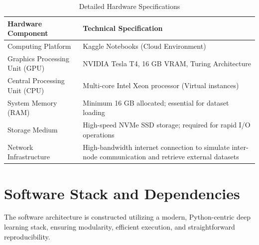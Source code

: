 \documentclass[12pt,a4paper]{report}
\begin{document}
\begin{table}[H]
\centering
\caption{Detailed Hardware Specifications}
\label{tab:hardware}
\begin{tabular}{p{4.5cm}p{7.5cm}}
\toprule
\textbf{Hardware Component} & \textbf{Technical Specification} \\
\midrule
Computing Platform & Kaggle Notebooks (Cloud Environment) \\
Graphics Processing Unit (GPU) & NVIDIA Tesla T4, 16 GB VRAM, Turing Architecture \\
Central Processing Unit (CPU) & Multi-core Intel Xeon processor (Virtual instances) \\
System Memory (RAM) & Minimum 16 GB allocated; essential for dataset loading \\
Storage Medium & High-speed NVMe SSD storage; required for rapid I/O operations \\
Network Infrastructure & High-bandwidth internet connection to simulate inter-node communication and retrieve external datasets \\
\bottomrule
\end{tabular}
\end{table}

\section{Software Stack and Dependencies}

The software architecture is constructed utilizing a modern, Python-centric deep learning stack, ensuring modularity, efficient execution, and straightforward reproducibility.
\end{document}
